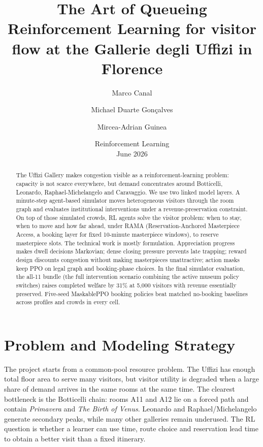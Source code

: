 \documentclass[11pt]{article}
\title{\textbf{The Art of Queueing}\\
\large Reinforcement Learning for visitor flow at the Gallerie degli Uffizi in Florence}
\author{Marco Canal \and Michael Duarte Gon\c{c}alves \and Mircea-Adrian Guinea}
\date{Reinforcement Learning \\ June 2026}
\newcommand{\added}[1]{{\color{green!50!black}#1}}
\begin{document}
\maketitle

\begin{abstract}
The Uffizi Gallery makes congestion visible as a reinforcement-learning problem: capacity is not
scarce everywhere, but demand concentrates around Botticelli, Leonardo, Raphael-Michelangelo and
Caravaggio. We use two linked model layers. A minute-step agent-based simulator moves
heterogeneous visitors through the room graph and evaluates institutional interventions under a
revenue-preservation constraint. On top of those simulated crowds, RL agents solve the
visitor problem: when to stay, when to move and how far ahead, under RAMA
\added{(Reservation-Anchored Masterpiece Access, a booking layer for fixed 10-minute masterpiece
windows)}, to reserve masterpiece slots. The technical work is mostly formulation. Appreciation
progress makes dwell decisions Markovian; dense closing pressure prevents late trapping; reward design
discounts congestion without making masterpieces unattractive; action masks keep PPO on legal graph
and booking-phase choices. In the final simulator evaluation, the all-11 bundle \added{(the full
intervention scenario combining the active museum policy switches)} raises completed welfare by 31\%
at 5,000 visitors with revenue essentially preserved. Five-seed MaskablePPO booking policies beat
matched no-booking baselines across profiles and crowds in every cell.
\end{abstract}

\section{Problem and Modeling Strategy}

The project starts from a common-pool resource problem. The Uffizi has enough total floor area to
serve many visitors, but visitor utility is degraded when a large share of demand arrives in the same
rooms at the same time. The clearest bottleneck is the Botticelli chain: rooms A11 and A12 lie on a
forced path and contain \emph{Primavera} and \emph{The Birth of Venus}. Leonardo and
Raphael/Michelangelo generate secondary peaks, while many other galleries remain underused. The RL
question is whether a learner can use time, route choice and reservation lead time to obtain a better
visit than a fixed itinerary.
\end{document}
